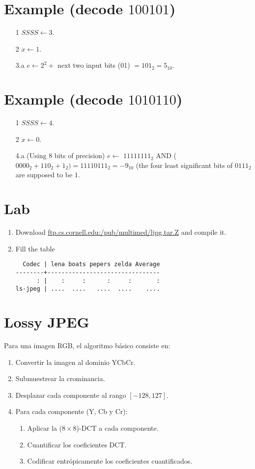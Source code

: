 \section*{Example (decode $100101$)}  
\begin{itemize}
\item [1] $SSSS\leftarrow 3$.
\item [2] $x\leftarrow 1$.
\item [3.a] $e\leftarrow 2^2+$ next two input bits (01) $=101_2=5_{10}$.
\end{itemize}

\section*{Example (decode $1010110$)}
\begin{itemize}
\item [1] $SSSS\leftarrow 4$.
\item [2] $x\leftarrow 0$.
\item [4.a] (Using 8 bits of precision) $e\leftarrow$ $11111111_2$ AND
  ($0000_2+110_2+1_2) = 11110111_2 = -9_{10}$ (the four least
  significant bits of $0111_2$ are supposed to be $1$.
\end{itemize}

\section*{Lab}
\begin{enumerate}
\item Download \url{ftp.cs.cornell.edu:/pub/multimed/ljpg.tar.Z} and
  compile it.
\item Fill the table
\begin{verbatim}
  Codec | lena boats pepers zelda Average
--------+--------------------------------
      : |    :     :      :     :       :
ls-jpeg | ....  ....   ....  ....    ....
\end{verbatim}
\end{enumerate}

\section{Lossy JPEG}
\noindent Para una imagen RGB, el algoritmo básico consiste en:
\begin{enumerate}
\item Convertir la imagen al dominio YCbCr.
\item Submuestrear la crominancia.
\item Desplazar cada componente al rango $[-128,127]$.
\item Para cada componente (Y, Cb y Cr):
  \begin{enumerate}
  \item Aplicar la ($8\times 8$)-DCT a cada componente.
  \item Cuantificar los coeficientes DCT.
  \item Codificar entrópicamente los coeficientes cuantificados.
  \end{enumerate}
\end{enumerate}


